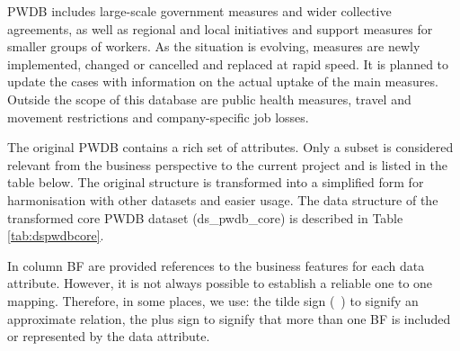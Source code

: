 PWDB includes large-scale government measures and wider collective agreements, as well as regional and local initiatives and support measures for smaller groups of workers. As the situation is evolving, measures are newly implemented, changed or cancelled and replaced at rapid speed. It is planned to update the cases with information on the actual uptake of the main measures. Outside the scope of this database are public health measures, travel and movement restrictions and company-specific job losses. 

The original PWDB contains a rich set of attributes. Only a subset is considered relevant from the business perspective to the current project and is listed in the table below. The original structure is transformed into a simplified form for harmonisation with other datasets and easier usage. The data structure of the transformed core PWDB dataset (ds\_pwdb\_core) is described in Table \ref{tab:dspwdbcore}.

In column BF are provided references to the business features for each data attribute. However, it is not always possible to establish a reliable one to one mapping. Therefore, in some places, we use: the tilde sign (~) to signify an approximate relation, the plus sign to signify that more than one BF is included or represented by the data attribute.

